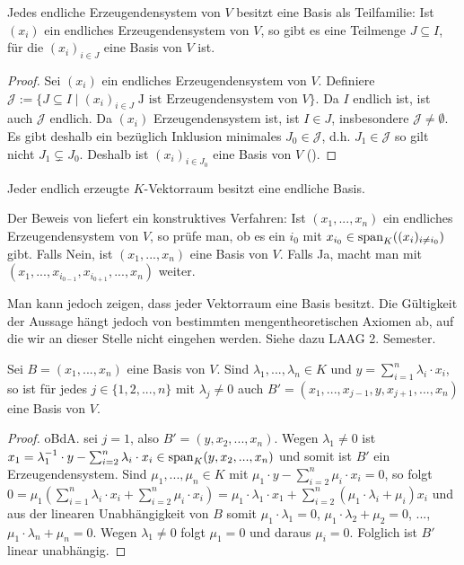 \begin{theorem}[Basisauswahlsatz]
	Jedes endliche Erzeugendensystem von $V$ besitzt eine Basis  als 
	Teilfamilie: Ist $(x_i)$ ein endliches Erzeugendensystem von $V$, so gibt es eine Teilmenge $J\subseteq I$, 
	für die $(x_i)_{i\in J}$ eine Basis von $V$ ist. 
\end{theorem}
\begin{proof}
	Sei $(x_i)$ ein endliches Erzeugendensystem von $V$. Definiere $\mathcal J:=\{J \subseteq I \mid (x_i)_{i\in J}\; 
	\text{J ist Erzeugendensystem von }V\}$. Da $I$ endlich ist, ist auch $\mathcal J$ endlich. Da $(x_i)$ 
	Erzeugendensystem ist, ist $I\in J$, insbesondere $\mathcal J\neq\emptyset$. Es gibt deshalb ein bezüglich 
	Inklusion minimales $J_0\in \mathcal J$, d.h. $J_1 \in \mathcal J$ so gilt nicht $J_1 \subsetneq J_0$. Deshalb 
	ist $(x_i)_{i\in J_0}$ eine Basis von $V$ ().
\end{proof}

\begin{conclusion}
	Jeder endlich erzeugte $K$-Vektorraum besitzt eine endliche Basis.
\end{conclusion}

\begin{remark}
	Der Beweis von  liefert ein konstruktives Verfahren: Ist $(x_1,...,x_n)$ ein endliches 
	Erzeugendensystem von $V$, so prüfe man, ob es ein $i_0$ mit $x_{i_0} \in \operatorname{span}_K((x_i)_{i\neq i_0})$ gibt. 
	Falls Nein, ist $(x_1,...,x_n)$ eine Basis von $V$. Falls Ja, macht man mit $(x_1,...,x_{i_{0-1}}, x_{i_{0+1}},
	...,x_n)$ weiter.
\end{remark}

\begin{remark}
	Man kann jedoch zeigen, dass jeder Vektorraum eine Basis besitzt. Die Gültigkeit der Aussage hängt jedoch 
	von bestimmten mengentheoretischen Axiomen ab, auf die wir an dieser Stelle nicht eingehen werden. Siehe dazu 
	LAAG 2. Semester.
\end{remark}

\begin{lemma}[Austauschlemma]
	Sei $B=(x_1,...,x_n)$  eine Basis von $V$. Sind $\lambda_1,...,\lambda_n \in K$ und 
	$y=\sum_{i=1}^n \lambda_i\cdot x_i$, so ist für jedes $j\in \{1,2,...,n\}$ mit $\lambda_j\neq 0$ auch 
	$B'=(x_1,...,x_{j-1},y,x_{j+1},...,x_n)$ eine Basis von $V$.
\end{lemma}
\begin{proof}
	oBdA. sei $j=1$, also $B'=(y,x_2,...,x_n)$. Wegen $\lambda_1\neq 0$ ist $x_1=\lambda_1^{-1}\cdot y - \sum
	_{i=2}^n \lambda_i\cdot x_i \in \operatorname{span}_K(y,x_2,...,x_n)$ und somit ist $B'$ ein Erzeugendensystem. Sind 
	$\mu_1,...,\mu_n \in K$ mit $\mu_1\cdot y - \sum_{i=2}^n \mu_i\cdot x_i=0$, so folgt $0=\mu_1(\sum
	_{i=1}^n \lambda_i\cdot x_i + \sum_{i=2}^n \mu_i\cdot x_i)=\mu_1\cdot \lambda_1\cdot x_1 + \sum
	_{i=2}^n (\mu_1\cdot \lambda_i + \mu_i)x_i$ und aus der linearen Unabhängigkeit von $B$ somit $\mu_1\cdot 
	\lambda_1=0$, $\mu_1\cdot \lambda_2 + \mu_2 =0$, ..., $\mu_1\cdot\lambda_n + \mu_n=0$. Wegen $\lambda_1\neq 0$ folgt 
	$\mu_1=0$ und daraus $\mu_i=0$. Folglich ist $B'$ linear unabhängig.
\end{proof}

